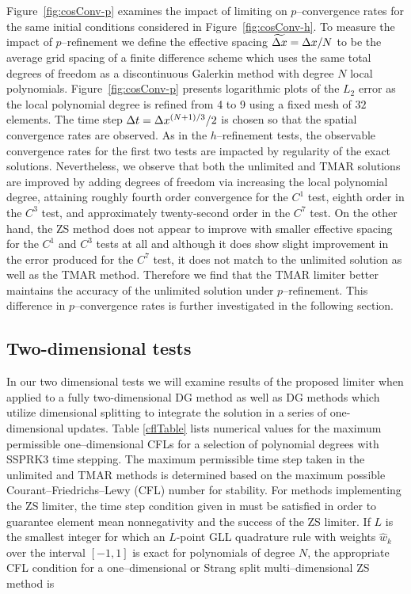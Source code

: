 \documentclass{ametsoc}
\begin{document}
Figure~\ref{fig:cosConv-p} examines the impact of limiting on $p$--convergence rates for the same initial conditions considered in Figure~\ref{fig:cosConv-h}. To measure the impact of $p$--refinement we define the effective spacing $\widetilde{\Delta x} = \Delta x/N$ to be the average grid spacing of a finite difference scheme which uses the same total degrees of freedom as a discontinuous Galerkin method with degree $N$ local polynomials. Figure~\ref{fig:cosConv-p} presents logarithmic plots of the $L_2$ error as the local polynomial degree is refined from 4 to 9 using a fixed mesh of $32$ elements. The time step $\Delta t = \Delta x^{(N+1)/3}/2$ is chosen so that the spatial convergence rates are observed. As in the $h$--refinement tests, the observable convergence rates for the first two tests are impacted by regularity of the exact solutions. Nevertheless, we observe that both the unlimited and TMAR solutions are improved by adding degrees of freedom via increasing the local polynomial degree, attaining roughly fourth order convergence for the $C^1$ test, eighth order in the $C^3$ test, and approximately twenty-second order in the $C^7$ test. On the other hand, the ZS method does not appear to improve with smaller effective spacing for the $C^1$ and $C^3$ tests at all and although it does show slight improvement in the error produced for the $C^7$ test, it does not match to the unlimited solution as well as the TMAR method. Therefore we find that the TMAR limiter better maintains the accuracy of the unlimited solution under $p$--refinement. This difference in $p$--convergence rates is further investigated in the following section.

\subsection*{Two-dimensional tests}

In our two dimensional tests we will examine results of the proposed limiter when applied to a fully two-dimensional DG method as well as DG methods which utilize dimensional splitting \citep{strang68} to integrate the solution in a series of one-dimensional updates. Table \ref{cflTable} lists numerical values for the maximum permissible one--dimensional CFLs for a selection of polynomial degrees with SSPRK3 time stepping. The maximum permissible time step taken in the unlimited and TMAR methods is determined based on the maximum possible Courant--Friedrichs--Lewy (CFL) number for stability. For methods implementing the ZS limiter, the time step condition given in \citep{Zhang2010} must be satisfied in order to guarantee element mean nonnegativity and the success of the ZS limiter. If $L$ is the smallest integer for which an $L$-point GLL quadrature rule with weights $\hat{w}_k$ over the interval $[-1,1]$ is exact for polynomials of degree $N$, the appropriate CFL condition for a one--dimensional or Strang split multi--dimensional ZS method is
\end{document}
